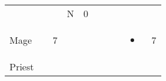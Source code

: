\documentclass[12pt]{article}
\newcommand{\indexClass}[1]{\index{#1}}
\newcommand{\class}[1]{#1\indexClass{#1}}
\begin{document}
\begin{longtable}[]{@{}llllllllll@{}}
\begin{minipage}[t]{0.06\columnwidth}
\strut\end{minipage} &
\begin{minipage}[t]{0.06\columnwidth}\raggedright\strut
\strut\end{minipage} &
\begin{minipage}[t]{0.06\columnwidth}\raggedright\strut
\strut\end{minipage} &
\begin{minipage}[t]{0.07\columnwidth}\raggedright\strut
N
\strut\end{minipage} &
\begin{minipage}[t]{0.08\columnwidth}\raggedright\strut
0
\strut\end{minipage}\tabularnewline
\begin{minipage}[t]{0.13\columnwidth}\raggedright\strut
\class{Mage}
\strut\end{minipage} &
\begin{minipage}[t]{0.06\columnwidth}\raggedright\strut
\strut\end{minipage} &
\begin{minipage}[t]{0.06\columnwidth}\raggedright\strut
7
\strut\end{minipage} &
\begin{minipage}[t]{0.06\columnwidth}\raggedright\strut
\strut\end{minipage} &
\begin{minipage}[t]{0.06\columnwidth}\raggedright\strut
\strut\end{minipage} &
\begin{minipage}[t]{0.06\columnwidth}\raggedright\strut
\strut\end{minipage} &
\begin{minipage}[t]{0.06\columnwidth}\raggedright\strut
\strut\end{minipage} &
\begin{minipage}[t]{0.06\columnwidth}\raggedright\strut
\strut\end{minipage} &
\begin{minipage}[t]{0.07\columnwidth}\raggedright\strut
\begin{itemize}
\item
\end{itemize}
\strut\end{minipage} &
\begin{minipage}[t]{0.08\columnwidth}\raggedright\strut
7
\strut\end{minipage}\tabularnewline
\begin{minipage}[t]{0.13\columnwidth}\raggedright\strut
\class{Priest}

\end{minipage}
\end{longtable}
\end{document}
